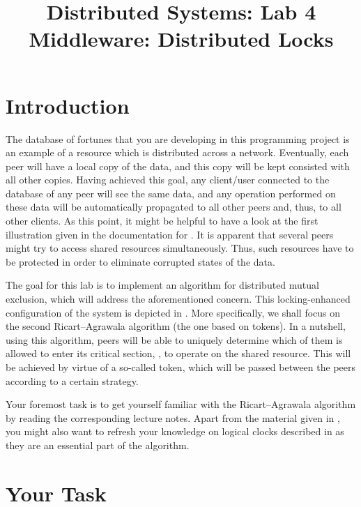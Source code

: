 \documentclass[a4paper]{article}
\title{%
  Distributed Systems: Lab 4\\%
  Middleware: Distributed Locks%
}
\author{}
\begin{document}
\maketitle

\section{Introduction}

The database of fortunes that you are developing in this programming project is
an example of a resource which is distributed across a network. Eventually, each
peer will have a local copy of the data, and this copy will be kept consisted
with all other copies. Having achieved this goal, any client/user connected to
the database of any peer will see the same data, and any operation performed on
these data will be automatically propagated to all other peers and, thus, to all
other clients. As this point, it might be helpful to have a look at the first
illustration given in the documentation for . It is apparent that
several peers might try to access shared resources simultaneously. Thus, such
resources have to be protected in order to eliminate corrupted states of the
data.

The goal for this lab is to implement an algorithm for distributed mutual
exclusion, which will address the aforementioned concern. This locking-enhanced
configuration of the system is depicted in . More specifically, we
shall focus on the second Ricart--Agrawala algorithm \cite{lecture67} (the one
based on tokens). In a nutshell, using this algorithm, peers will be able to
uniquely determine which of them is allowed to enter its critical section, \ie,
to operate on the shared resource. This will be achieved by virtue of a
so-called token, which will be passed between the peers according to a certain
strategy.

Your foremost task is to get yourself familiar with the Ricart--Agrawala
algorithm by reading the corresponding lecture notes. Apart from the material
given in \cite{lecture67}, you might also want to refresh your knowledge on
logical clocks described in \cite{lecture5} as they are an essential part of the
algorithm.

\section{Your Task}
\end{document}
